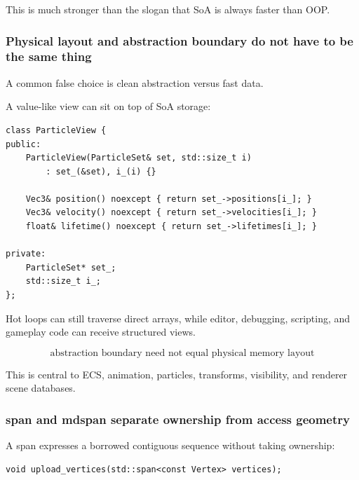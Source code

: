 This is much stronger than the slogan that SoA is always faster than OOP.

\subsubsection{Physical layout and abstraction boundary do not have to be the same thing}\label{01-foundations-i-ch005-physical-layout-and-abstraction-boundary-do-not-have-to-be-the-same-thing}

\hypertarget{01-foundations-i-ch005-physical-layout-and-abstraction-boundary-do-not-have-to-be-the-same-thing}{}

A common false choice is clean abstraction versus fast data.

A value-like view can sit on top of SoA storage:

\begin{verbatim}
class ParticleView {
public:
    ParticleView(ParticleSet& set, std::size_t i)
        : set_(&set), i_(i) {}

    Vec3& position() noexcept { return set_->positions[i_]; }
    Vec3& velocity() noexcept { return set_->velocities[i_]; }
    float& lifetime() noexcept { return set_->lifetimes[i_]; }

private:
    ParticleSet* set_;
    std::size_t i_;
};
\end{verbatim}

Hot loops can still traverse direct arrays, while editor, debugging, scripting, and gameplay code can receive structured views.

\[
\boxed{
\text{abstraction boundary need not equal physical memory layout}
}
\]

This is central to ECS, animation, particles, transforms, visibility, and renderer scene databases.

\subsubsection{span and mdspan separate ownership from access geometry}\label{01-foundations-i-ch005-span-and-mdspan-separate-ownership-from-access-geometry}

\hypertarget{01-foundations-i-ch005-span-and-mdspan-separate-ownership-from-access-geometry}{}

A span expresses a borrowed contiguous sequence without taking ownership:

\begin{verbatim}
void upload_vertices(std::span<const Vertex> vertices);
\end{verbatim}

